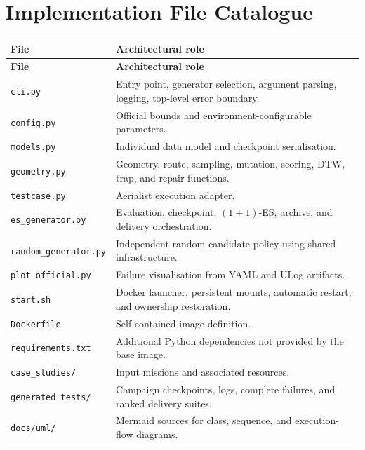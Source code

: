 \documentclass[11pt,a4paper]{report}
\newcommand{\code}[1]{\texttt{#1}}
\begin{document}
\appendix
\chapter{Implementation File Catalogue}
\begin{longtable}{L{4.2cm} L{10.3cm}}
\toprule
\textbf{File} & \textbf{Architectural role}\\
\midrule
\endfirsthead
\toprule
\textbf{File} & \textbf{Architectural role}\\
\midrule
\endhead
\code{cli.py} & Entry point, generator selection, argument parsing, logging, top-level error boundary.\\
\code{config.py} & Official bounds and environment-configurable parameters.\\
\code{models.py} & Individual data model and checkpoint serialisation.\\
\code{geometry.py} & Geometry, route, sampling, mutation, scoring, DTW, trap, and repair functions.\\
\code{testcase.py} & Aerialist execution adapter.\\
\code{es\_generator.py} & Evaluation, checkpoint, $(1+1)$-ES, archive, and delivery orchestration.\\
\code{random\_generator.py} & Independent random candidate policy using shared infrastructure.\\
\code{plot\_official.py} & Failure visualisation from YAML and ULog artifacts.\\
\code{start.sh} & Docker launcher, persistent mounts, automatic restart, and ownership restoration.\\
\code{Dockerfile} & Self-contained image definition.\\
\code{requirements.txt} & Additional Python dependencies not provided by the base image.\\
\code{case\_studies/} & Input missions and associated resources.\\
\code{generated\_tests/} & Campaign checkpoints, logs, complete failures, and ranked delivery suites.\\
\code{docs/uml/} & Mermaid sources for class, sequence, and execution-flow diagrams.\\
\bottomrule
\end{longtable}
\end{document}
